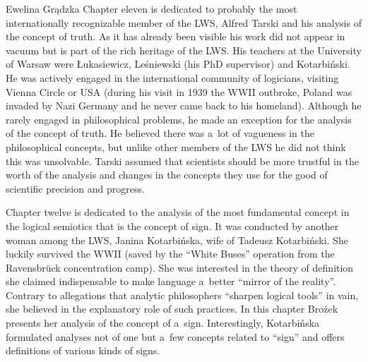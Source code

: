 \begin{newrevengenv}{Ewelina Grądzka}
Chapter eleven is dedicated to probably the most internationally recognizable member of the LWS, Alfred Tarski and his analysis of the concept of truth. As it has already been visible his work did not appear in vacuum but is part of the rich heritage of the LWS. His teachers at the University of Warsaw were Łukasiewicz, Leśniewski (his PhD supervisor) and Kotarbiński. He was actively engaged in the international community of logicians, visiting Vienna Circle or USA (during his visit in 1939 the WWII outbroke, Poland was invaded by Nazi Germany and he never came back to his homeland). Although he rarely engaged in philosophical problems, he made an exception for the analysis of the concept of truth. He believed there was a~lot of vagueness in the philosophical concepts, but unlike other members of the LWS he did not think this was unsolvable. Tarski assumed that scientists should be more trustful in the worth of the analysis and changes in the concepts they use for the good of scientific precision and progress.

Chapter twelve is dedicated to the analysis of the most fundamental concept in the logical semiotics that is the concept of sign. It was conducted by another woman among the LWS, Janina Kotarbińska, wife of Tadeusz Kotarbiński. She luckily survived the WWII (saved by the ``White Buses'' operation from the Ravensbrück concentration camp). She was interested in the theory of definition she claimed indispensable to make language a~better ``mirror of the reality''. Contrary to allegations that analytic philosophers ``sharpen logical tools'' in vain, she believed in the explanatory role of such practices. In this chapter Brożek presents her analysis of the concept of a~sign. Interestingly, Kotarbińska formulated analyses not of one but a~few concepts related to ``sign'' and offers definitions of various kinds of signs.


\end{newrevengenv}
